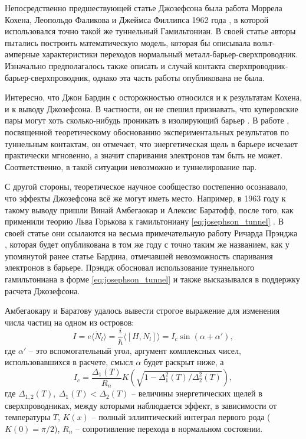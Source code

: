 \documentclass[14pt, a4paper]{extreport}
\numberwithin{equation}{section}
\begin{document}
Непосредственно предшествующей статье Джозефсона была работа Моррела Кохена, Леопольдо Фаликова и Джеймса Филлипса 1962 года \cite{cohen1962superconductive}, в которой использовался точно такой же туннельный Гамильтониан. В своей статье авторы пытались построить математическую модель, которая бы описывала вольт-амперные характеристики переходов нормальный металл-барьер-сверхпроводник. Изначально предполагалось также описать и случай контакта сверхпроводник-барьер-сверхпроводник, однако эта часть работы опубликована не была. 

Интересно, что Джон Бардин с осторожностью относился и к результатам Кохена, и к выводу Джозефсона. В частности, он не спешил признавать, что куперовские пары могут хоть сколько-нибудь проникать в изолирующий барьер \cite{josephsonnobel}. В работе \cite{bardeen1961tunnelling}, посвященной теоретическому обоснованию экспериментальных результатов по туннельным контактам, он отмечает, что энергетическая щель в барьере исчезает практически мгновенно, а значит спаривания электронов там быть не может. Соответственно, в такой ситуации невозможно и туннелирование пар.

С другой стороны, теоретическое научное сообщество постепенно осознавало, что эффекты Джозефсона всё же могут иметь место. Например, в 1963 году к такому выводу пришли Винай Амбегаокар и Алексис Баратофф, после того, как применили теорию Льва Горькова к гамильтониану \eqref{eq:josephson_tunnel} \cite{ambegaokar1963tunneling}. В своей статье они ссылаются на весьма примечательную работу Ричарда Прэнджа \cite{prange1963tunneling}, которая будет опубликована в том же году с точно таким же названием, как у упомянутой ранее статье Бардина, отмечавшей невозможность спаривания электронов в барьере. Прэндж обосновал использование туннельного гамильтониана в форме \eqref{eq:josephson_tunnel} и также высказывался в поддержку расчета Джозефсона.

Амбегаокару и Баратову удалось вывести строгое выражение для изменения числа частиц на одном из островов:
\begin{equation}
	I = e \langle \dot N_l \rangle =  \frac{i}{\hbar}\langle [H, N_l] \rangle = I_c \sin(\alpha + \alpha'),
\end{equation}
где $\alpha'$ -- это вспомогательный угол, аргумент комплексных чисел, использовавшихся в расчете, смысл $\alpha$ будет раскрыт ниже, а 
\begin{equation}
	I_c = \frac{\Delta_1(T)}{R_n} K \left(\sqrt{1 - \Delta_1^2(T)/\Delta_2^2(T)}\right),
\end{equation}
где $\Delta_{1,2}(T),\ \Delta_1(T) < \Delta_2(T)$ -- величины энергетических щелей в сверхпроводниках, между которыми наблюдается эффект, в зависимости от температуры $T$, $K(x)$ -- полный эллиптический интеграл первого рода ($K(0) = \pi/2$), $R_n$ -- сопротивление перехода в нормальном состоянии.
\end{document}
